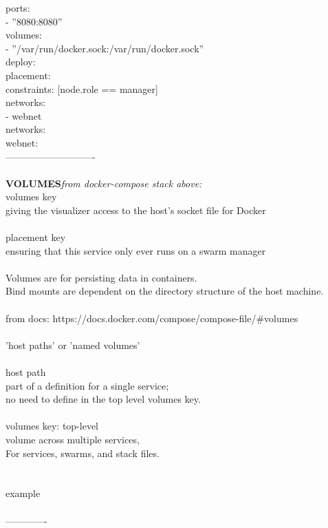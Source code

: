 \documentclass[10pt,a4paper]{article}
\begin{document}
{{{{{{{{{    ports:\\
      - ''8080:8080''\\
    volumes:\\
      - ''/var/run/docker.sock:/var/run/docker.sock''\\
    deploy:\\
      placement:\\
        constraints: [node.role == manager]\\
    networks:\\
      - webnet\\
networks:\\
  webnet:\\
----------------------------\\
\\
\textbf{VOLUMES}}{\large \textit{from docker-compose stack above:}}{\large \\
	volumes key\\
	giving the visualizer access to the host’s socket file for Docker\\
\\
	placement key\\
	ensuring that this service only ever runs on a swarm manager\\
\\
Volumes are for persisting data in containers. \\
Bind mounts are dependent on the directory structure of the host machine.\\
\\
from docs: }https://docs.docker.com/compose/compose-file/\#volumes{\large \\
\\
'host paths' or 'named volumes'\\
\\
host path\\
	part of a definition for a single service; \\
	no need to define in the top level volumes key.\\
\\
volumes key: top-level\\
	volume across multiple services, \\
	For services, swarms, and stack files.\\
	[Note: replaces 'volumes\_from' in earlier versions of the compose]\\
\\
example\\
\\
-------------\\
}}}}}}}}}
\end{document}
